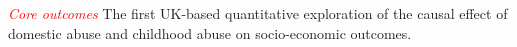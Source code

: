 \documentclass[11pt, a4paper]{article}
\begin{document}








%
%
% 
%
%
%
%
%

\textcolor{red}{\textit{Core outcomes}}
 The first UK-based quantitative exploration of the causal effect of domestic abuse and childhood abuse on socio-economic outcomes.
\FloatBarrier
\end{document}
